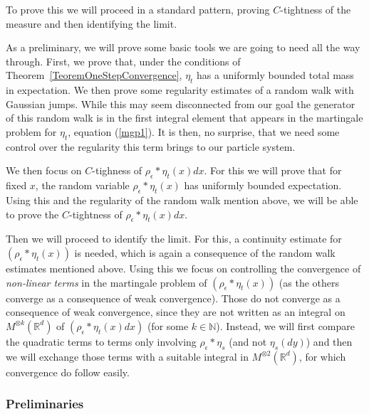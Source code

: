 \documentclass[12pt]{article}
\newcommand{\IR}{\mathbb R}
\begin{document}
To prove this we will proceed in a standard pattern, proving $C$-tightness of the measure and then identifying the limit.

As a preliminary, we will prove some basic tools we are going to need all the way through. First, we prove that, under the conditions of Theorem~\ref{TeoremOneStepConvergence}, $\eta_t$ has a uniformly bounded total mass in expectation. We then prove some regularity estimates of a random walk with Gaussian jumps. While this may seem disconnected from our goal the generator of this random walk is in the first integral element that appears in the martingale problem for $\eta_t$, equation (\ref{mgp1}). It is then, no surprise, that we need some control over the regularity this term brings to our particle system.

We then focus on $C$-tighness of $\rho_\epsilon * \eta_t(x)dx$. For this we will prove that for fixed $x$, the random variable $\rho_\epsilon*\eta_t(x)$ has uniformly bounded expectation. Using this and the regularity of the random walk mention above, we will be able to prove the $C$-tightness of $\rho_\epsilon * \eta_t(x)dx$.

Then we will proceed to identify the limit. For this, a continuity estimate for $(\rho_\epsilon*\eta_t(x))$ is needed, which is again a consequence of the random walk estimates mentioned above. Using this we focus on controlling the convergence of \textit{non-linear terms} in the martingale problem of $(\rho_\epsilon*\eta_t(x))$ (as the others converge as a consequence of weak convergence). Those do not converge as a consequence of weak convergence, since they are not written as an integral on $M^{\otimes k}(\IR^d)$ of $(\rho_\epsilon*\eta_t(x) dx)$ (for some $k \in \mathbb{N}$). Instead, we will first compare the quadratic terms to terms only involving $\rho_\epsilon*\eta_s$ (and not $\eta_s(dy)$) and then we will exchange those terms with a suitable integral in $M^{\otimes2}(\IR^d)$, for which convergence do follow easily.

\subsubsection{Preliminaries}
\end{document}
